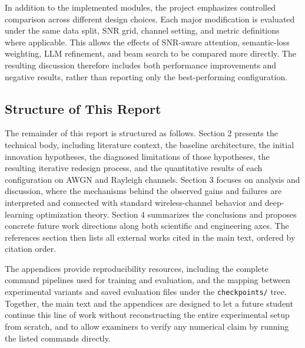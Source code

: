 In addition to the implemented modules, the project emphasizes controlled comparison across different design choices. Each major modification is evaluated under the same data split, SNR grid, channel setting, and metric definitions where applicable. This allows the effects of SNR-aware attention, semantic-loss weighting, LLM refinement, and beam search to be compared more directly. The resulting discussion therefore includes both performance improvements and negative results, rather than reporting only the best-performing configuration.

\subsection{Structure of This Report}

The remainder of this report is structured as follows. Section 2 presents the technical body, including literature context, the baseline architecture, the initial innovation hypotheses, the diagnosed limitations of those hypotheses, the resulting iterative redesign process, and the quantitative results of each configuration on AWGN and Rayleigh channels. Section 3 focuses on analysis and discussion, where the mechanisms behind the observed gains and failures are interpreted and connected with standard wireless-channel behavior and deep-learning optimization theory. Section 4 summarizes the conclusions and proposes concrete future work directions along both scientific and engineering axes. The references section then lists all external works cited in the main text, ordered by citation order.

The appendices provide reproducibility resources, including the complete command pipelines used for training and evaluation, and the mapping between experimental variants and saved evaluation files under the \texttt{checkpoints/} tree. Together, the main text and the appendices are designed to let a future student continue this line of work without reconstructing the entire experimental setup from scratch, and to allow examiners to verify any numerical claim by running the listed commands directly.
